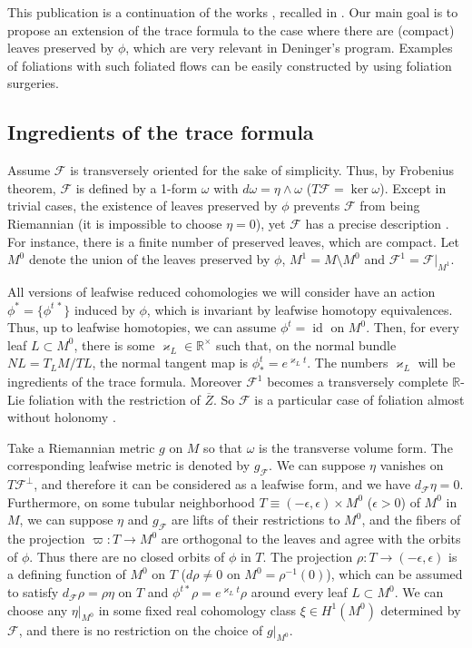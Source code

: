 \documentclass{memo-l}
\theoremstyle{plain}
\theoremstyle{definition}
\theoremstyle{remark}
\newcommand{\R}{\mathbb{R}}
\newcommand{\FF}{\mathcal{F}}
\newcommand{\id}{\operatorname{id}}
\numberwithin{section}{chapter}
\numberwithin{equation}{section}%
\begin{document}
This publication is a continuation of the works \cite{AlvKordy2001,AlvKordy2002,AlvKordy2008a}, recalled in . Our main goal is to propose an extension of the trace formula to the case where there are (compact) leaves preserved by $\phi$, which are very relevant in Deninger's program. Examples of foliations with such foliated flows can be easily constructed by using foliation surgeries.

\subsection{Ingredients of the trace formula}\label{ss: general - ingredients}

Assume $\FF$ is transversely oriented for the sake of simplicity. Thus, by Frobenius theorem, $\FF$ is defined by a 1-form $\omega$ with $d\omega=\eta\wedge\omega$ ($T\FF=\ker\omega$). Except in trivial cases, the existence of leaves preserved by $\phi$ prevents $\FF$ from being Riemannian (it is impossible to choose $\eta=0$), yet $\FF$ has a precise description \cite{AlvKordyLeichtnam2022}. For instance, there is a finite number of preserved leaves, which are compact. Let $M^0$ denote the union of the leaves preserved by $\phi$, $M^1=M\setminus M^0$ and $\FF^1=\FF|_{M^1}$.

All versions of leafwise reduced cohomologies we will consider have an action $\phi^*=\{\phi^{t\,*}\}$ induced by $\phi$, which is invariant by leafwise homotopy equivalences. Thus, up to leafwise homotopies, we can assume $\phi^t=\id$ on $M^0$. Then, for every leaf $L\subset M^0$, there is some $\varkappa_L\in\R^\times$ such that, on the normal bundle $NL=T_LM/TL$, the normal tangent map is $\phi^t_*=e^{\varkappa_Lt}$. The numbers $\varkappa_L$ will be ingredients of the trace formula. Moreover $\FF^1$ becomes a transversely complete $\R$-Lie foliation with the restriction of $\overline Z$. So $\FF$ is a particular case of foliation almost without holonomy \cite{Hector1972c,Hector1978}.

Take a Riemannian metric $g$ on $M$ so that $\omega$ is the transverse volume form. The corresponding leafwise metric is denoted by $g_\FF$. We can suppose $\eta$ vanishes on $T\FF^\perp$, and therefore it can be considered as a leafwise form, and we have $d_\FF\eta=0$. Furthermore, on some tubular neighborhood $T\equiv(-\epsilon,\epsilon)\times M^0$ ($\epsilon>0$) of $M^0$ in $M$, we can suppose $\eta$ and $g_\FF$ are lifts of their restrictions to $M^0$, and the fibers of the projection $\varpi:T\to M^0$ are orthogonal to the leaves and agree with the orbits of $\phi$. Thus there are no closed orbits of $\phi$ in $T$. The projection $\rho:T\to(-\epsilon,\epsilon)$ is a defining function of $M^0$ on $T$ ($d\rho\ne0$ on $M^0=\rho^{-1}(0)$), which can be assumed to satisfy $d_\FF\rho=\rho\eta$ on $T$ and $\phi^{t*}\rho=e^{\varkappa_L t}\rho$ around every leaf $L\subset M^0$. We can choose any $\eta|_{M^0}$ in some fixed real cohomology class $\xi\in H^1(M^0)$ determined by $\FF$, and there is no restriction on the choice of $g|_{M^0}$.
\end{document}
